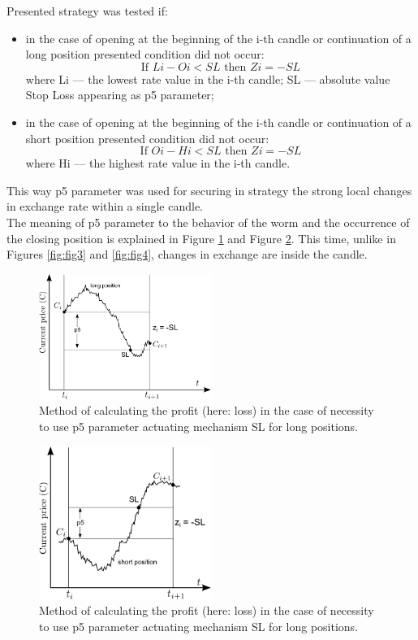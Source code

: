 \documentclass[runningheads,a4paper]{llncs}
\begin{document}
\noindent Presented strategy was tested if:
\begin{itemize}
\item in the case of opening at the beginning of the i-th candle or continuation of a long position presented condition did not occur:\\
\begin{equation}
\text{If } Li-Oi<SL \text{ then } Zi=-SL
\end{equation}
where Li --– the lowest rate value in the i-th candle; SL --– absolute value Stop Loss appearing as p5 parameter;
\item in the case of opening at the beginning of the i-th candle or continuation of a short position presented condition did not occur:
\begin{equation}
\text{If } Oi-Hi<SL \text{ then } Zi=-SL
\end{equation}
where Hi --– the highest rate value in the i-th candle.
\end{itemize}
This way p5 parameter was used for securing in strategy the strong local changes in exchange rate within a single candle.\\
The meaning of p5 parameter to the behavior of the worm and the occurrence of the closing position is explained in Figure \ref{fig:fig5} and Figure \ref{fig:fig6}. This time, unlike in Figures \ref{fig:fig3} and \ref{fig:fig4}, changes in exchange are inside the candle.
\begin{figure}[h!]
\centering
\includegraphics[width = 0.5\textwidth]{figures/rys5.png}
\caption{Method of calculating the profit (here: loss) in the case of necessity to use p5 parameter actuating mechanism SL for long positions.}
\label{fig:fig5}
\end{figure}
\FloatBarrier
\begin{figure}[h!]
\centering
\includegraphics[width = 0.5\textwidth]{figures/rys6.png}
\caption{Method of calculating the profit (here: loss) in the case of necessity to use p5 parameter actuating mechanism SL for long positions.}
\label{fig:fig6}
\end{figure}
\FloatBarrier
\end{document}
